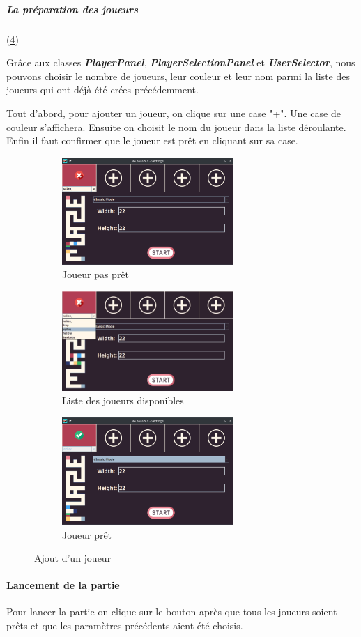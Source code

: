 \newpage

\subparagraph*{La préparation des joueurs} (\ref{fig:PlayerSelection})

Grâce aux classes \textbf{\textit{PlayerPanel}}, \textbf{\textit{PlayerSelectionPanel}} et \textbf{\textit{UserSelector}}, nous pouvons choisir le nombre de joueurs, leur couleur et leur nom parmi la liste des joueurs qui ont déjà été crées précédemment.

Tout d'abord, pour ajouter un joueur, on clique sur une case "+". Une case de couleur s'affichera. Ensuite on choisit le nom du joueur dans la liste déroulante. Enfin il faut confirmer que le joueur est prêt en cliquant sur sa case.

\begin{figure}[h!]
    \centering
    \begin{subfigure}{6.5cm}
        \includegraphics[width=6.5cm]{ressources/Implementation/Labyrinthe/Controleur/SettingsMenu_NotReady.png}%
        \caption{Joueur pas prêt}
        \label{fig:PlayerNotReady}
    \end{subfigure}
    \qquad
    \begin{subfigure}{6.5cm}
        \includegraphics[width=6.5cm]{ressources/Implementation/Labyrinthe/Controleur/SettingsMenu_PlayerList.png}%
        \caption{Liste des joueurs disponibles}
        \label{fig:PlayersAvailable}
    \end{subfigure}
    \qquad
    \begin{subfigure}{6.5cm}
        \includegraphics[width=6.5cm]{ressources/Implementation/Labyrinthe/Controleur/SettingsMenu_Ready.png}%
        \caption{Joueur prêt}
        \label{fig:PlayerReady}
    \end{subfigure}
    \caption{Ajout d'un joueur}
    \label{fig:PlayerSelection}
\end{figure}
\FloatBarrier

\paragraph{Lancement de la partie}

Pour lancer la partie on clique sur le bouton
après que tous les joueurs soient prêts et que les paramètres précédents aient été choisis.